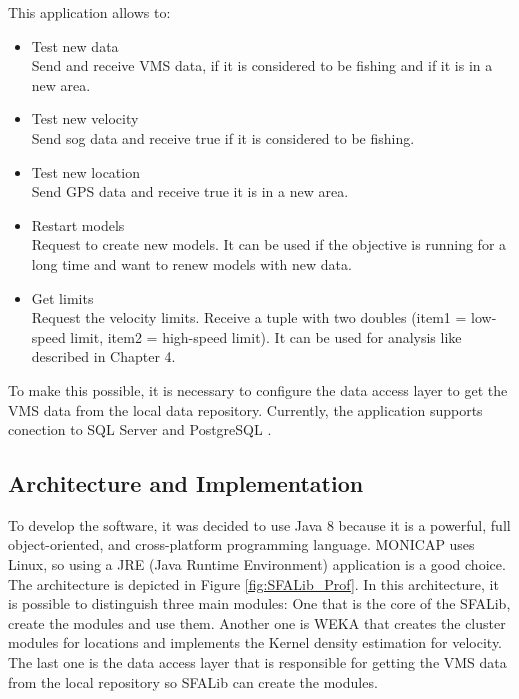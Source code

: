 This application allows to:
\begin{itemize}
\item Test new data \\ Send and receive VMS data, if it is considered to be fishing and if it is in a new area.
\item Test new velocity \\ Send sog data and receive true if it is considered to be fishing.
\item Test new location \\ Send GPS data and receive true it is in a new area.
\item Restart models \\ Request to create new models. It can be used if the objective is running for a long time and want to renew models with new data. 
\item Get limits \\ Request the velocity limits. Receive a tuple with two doubles (item1 = low-speed limit, item2 = high-speed limit). It can be used for analysis like described in Chapter 4.
\end{itemize}

To make this possible, it is necessary to configure the data access layer to get the VMS data from the local data repository.
Currently, the application supports conection to SQL Server \cite{WEBSITE:SqlServer} and PostgreSQL \cite{WEBSITE:Postgresql}.




\subsection{Architecture and Implementation} %
\label{sub:architecturee_implementation}
To develop the software, it was decided to use Java 8 \cite{WEBSITE:OraJava8} because it is a powerful, full object-oriented, and cross-platform programming language. MONICAP uses Linux, so using a JRE (Java Runtime Environment) application is a good choice.
The architecture is depicted in Figure \ref{fig:SFALib_Prof}. In this architecture, it is possible to distinguish three main modules: One that is the core of the SFALib, create the modules and use them. Another one is WEKA \cite{WEBSITE:Weka} that creates the cluster modules for locations and implements the Kernel density estimation  for velocity. The last one is the data access layer that is responsible for getting the VMS data from the local repository so SFALib can create the modules.



